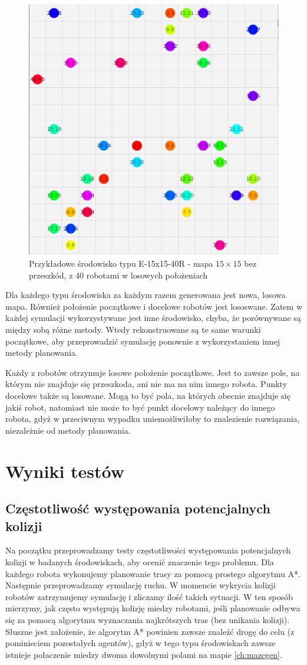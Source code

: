 \begin{figure}
	\centering
	\includegraphics[width=0.6\columnwidth]{img/robopath/tests-15-15-empty-40}
	\caption{Przykładowe środowisko typu E-15x15-40R - mapa $15 \times 15$ bez przeszkód, z 40 robotami w losowych położeniach}
	\label{fig:test-env-15-15-empty-40}
\end{figure}

Dla każdego typu środowiska za każdym razem generowana jest nowa, losowa mapa. Również położenie początkowe i docelowe robotów jest lososwane. Zatem w każdej symulacji wykorzystywane jest inne środowisko, chyba, że porównywane są między sobą różne metody. Wtedy rekonstruowane są te same warunki początkowe, aby przeprowadzić symulację ponownie z wykorzystaniem innej metody planowania.

Każdy z robotów otrzymuje losowe położenie początkowe. Jest to zawsze pole, na którym nie znajduje się przeszkoda, ani nie ma na nim innego robota.
Punkty docelowe także są losowane. Mogą to być pola, na których obecnie znajduje się jakiś robot, natomiast nie może to być punkt docelowy należący do innego robota, gdyż w przeciwnym wypadku uniemożliwiłoby to znalezienie rozwiązania, niezależnie od metody planowania.

\section{Wyniki testów}
\label{ch:test-results}
\subsection{Częstotliwość występowania potencjalnych kolizji} %
Na początku przeprowadzamy testy częstotliwości występowania potencjalnych kolizji w badanych środowiskach, aby ocenić znaczenie tego problemu.
Dla każdego robota wykonujemy planowanie trasy za pomocą prostego algorytmu A*. Następnie przeprowadzamy symulację ruchu. W momencie wykrycia kolizji robotów zatrzymujemy symulację i zliczamy ilość takich sytuacji. W ten sposób mierzymy, jak często występują kolizję miedzy robotami, jeśli planowanie odbywa się za pomocą algorytmu wyznaczania najkrótszych tras (bez unikania kolizji).
Słuszne jest założenie, że algorytm A* powinien zawsze znaleźć drogę do celu (z pominieciem pozostałych agentów), gdyż w tego typu środowiskach zawsze istnieje połaczenie miedzy dwoma dowolnymi polami na mapie \ref{ch:mazegen}.

